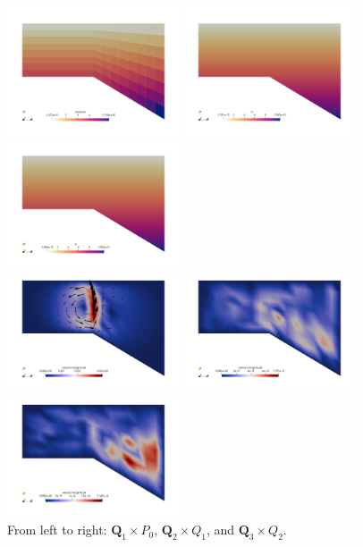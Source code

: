 \begin{center}
\includegraphics[width=5.1cm]{python_codes/fieldstone_42/results/geom2/press1}
\includegraphics[width=5.1cm]{python_codes/fieldstone_42/results/geom2/press2}
\includegraphics[width=5.1cm]{python_codes/fieldstone_42/results/geom2/press3}\\
\includegraphics[width=5.1cm]{python_codes/fieldstone_42/results/geom2/vel1}
\includegraphics[width=5.1cm]{python_codes/fieldstone_42/results/geom2/vel2}
\includegraphics[width=5.1cm]{python_codes/fieldstone_42/results/geom2/vel3}\\
{\captionfont From left to right: ${\bm Q}_1\times P_0$, ${\bm Q}_2\times Q_1$, 
and ${\bm Q}_3\times Q_2$.}
\end{center}


